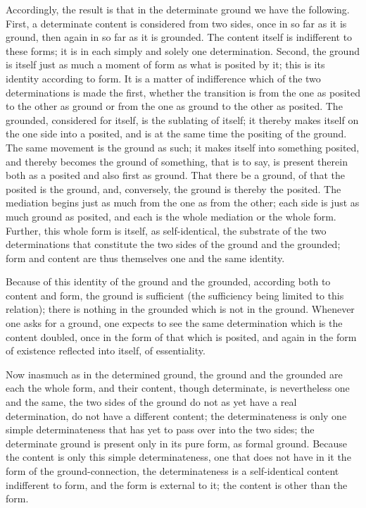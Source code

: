 Accordingly, the result is that
in the determinate ground we have the following.
First, a determinate content is considered from two sides,
once in so far as it is ground,
then again in so far as it is grounded.
The content itself is indifferent to these forms;
it is in each simply and solely one determination.
Second, the ground is itself just as much a moment of form
as what is posited by it; this is its identity according to form.
It is a matter of indifference
which of the two determinations is made the first,
whether the transition is
from the one as posited to the other as ground
or from the one as ground to the other as posited.
The grounded, considered for itself, is the sublating of itself;
it thereby makes itself on the one side into a posited,
and is at the same time the positing of the ground.
The same movement is the ground as such;
it makes itself into something posited,
and thereby becomes the ground of something,
that is to say, is present therein
both as a posited and also first as ground.
That there be a ground, of that the posited is the ground,
and, conversely, the ground is thereby the posited.
The mediation begins just as much from the one as from the other;
each side is just as much ground as posited,
and each is the whole mediation or the whole form.
Further, this whole form is itself, as self-identical,
the substrate of the two determinations
that constitute the two sides of the ground and the grounded;
form and content are thus themselves one and the same identity.

Because of this identity of the ground and the grounded,
according both to content and form,
the ground is sufficient
(the sufficiency being limited to this relation);
there is nothing in the grounded which is not in the ground.
Whenever one asks for a ground,
one expects to see the same determination
which is the content doubled,
once in the form of that which is posited,
and again in the form of existence
reflected into itself, of essentiality.

Now inasmuch as in the determined ground,
the ground and the grounded are each the whole form, and their content,
though determinate, is nevertheless one and the same,
the two sides of the ground do not as yet have a real determination,
do not have a different content;
the determinateness is only one simple determinateness
that has yet to pass over into the two sides;
the determinate ground is present
only in its pure form, as formal ground.
Because the content is only this simple determinateness,
one that does not have in it the form of the ground-connection,
the determinateness is a self-identical content indifferent to form,
and the form is external to it;
the content is other than the form.

